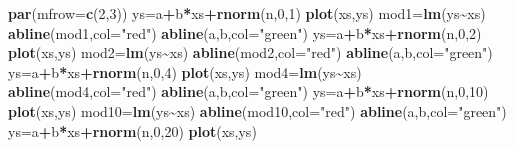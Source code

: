 \documentclass[
]{book}
\newenvironment{Shaded}{\begin{snugshade}}{\end{snugshade}}
\newcommand{\AttributeTok}[1]{\textcolor[rgb]{0.13,0.29,0.53}{#1}}
\newcommand{\DecValTok}[1]{\textcolor[rgb]{0.00,0.00,0.81}{#1}}
\newcommand{\FunctionTok}[1]{\textcolor[rgb]{0.13,0.29,0.53}{\textbf{#1}}}
\newcommand{\NormalTok}[1]{#1}
\newcommand{\OtherTok}[1]{\textcolor[rgb]{0.56,0.35,0.01}{#1}}
\newcommand{\SpecialCharTok}[1]{\textcolor[rgb]{0.81,0.36,0.00}{\textbf{#1}}}
\newcommand{\StringTok}[1]{\textcolor[rgb]{0.31,0.60,0.02}{#1}}
\begin{document}
\begin{Shaded}
\begin{Highlighting}[]
\FunctionTok{par}\NormalTok{(}\AttributeTok{mfrow=}\FunctionTok{c}\NormalTok{(}\DecValTok{2}\NormalTok{,}\DecValTok{3}\NormalTok{))}
\NormalTok{ys}\OtherTok{=}\NormalTok{a}\SpecialCharTok{+}\NormalTok{b}\SpecialCharTok{*}\NormalTok{xs}\SpecialCharTok{+}\FunctionTok{rnorm}\NormalTok{(n,}\DecValTok{0}\NormalTok{,}\DecValTok{1}\NormalTok{)}
\FunctionTok{plot}\NormalTok{(xs,ys)}
\NormalTok{mod1}\OtherTok{=}\FunctionTok{lm}\NormalTok{(ys}\SpecialCharTok{\textasciitilde{}}\NormalTok{xs)}
\FunctionTok{abline}\NormalTok{(mod1,}\AttributeTok{col=}\StringTok{"red"}\NormalTok{)}
\FunctionTok{abline}\NormalTok{(a,b,}\AttributeTok{col=}\StringTok{"green"}\NormalTok{)}
\NormalTok{ys}\OtherTok{=}\NormalTok{a}\SpecialCharTok{+}\NormalTok{b}\SpecialCharTok{*}\NormalTok{xs}\SpecialCharTok{+}\FunctionTok{rnorm}\NormalTok{(n,}\DecValTok{0}\NormalTok{,}\DecValTok{2}\NormalTok{)}
\FunctionTok{plot}\NormalTok{(xs,ys)}
\NormalTok{mod2}\OtherTok{=}\FunctionTok{lm}\NormalTok{(ys}\SpecialCharTok{\textasciitilde{}}\NormalTok{xs)}
\FunctionTok{abline}\NormalTok{(mod2,}\AttributeTok{col=}\StringTok{"red"}\NormalTok{)}
\FunctionTok{abline}\NormalTok{(a,b,}\AttributeTok{col=}\StringTok{"green"}\NormalTok{)}
\NormalTok{ys}\OtherTok{=}\NormalTok{a}\SpecialCharTok{+}\NormalTok{b}\SpecialCharTok{*}\NormalTok{xs}\SpecialCharTok{+}\FunctionTok{rnorm}\NormalTok{(n,}\DecValTok{0}\NormalTok{,}\DecValTok{4}\NormalTok{)}
\FunctionTok{plot}\NormalTok{(xs,ys)}
\NormalTok{mod4}\OtherTok{=}\FunctionTok{lm}\NormalTok{(ys}\SpecialCharTok{\textasciitilde{}}\NormalTok{xs)}
\FunctionTok{abline}\NormalTok{(mod4,}\AttributeTok{col=}\StringTok{"red"}\NormalTok{)}
\FunctionTok{abline}\NormalTok{(a,b,}\AttributeTok{col=}\StringTok{"green"}\NormalTok{)}
\NormalTok{ys}\OtherTok{=}\NormalTok{a}\SpecialCharTok{+}\NormalTok{b}\SpecialCharTok{*}\NormalTok{xs}\SpecialCharTok{+}\FunctionTok{rnorm}\NormalTok{(n,}\DecValTok{0}\NormalTok{,}\DecValTok{10}\NormalTok{)}
\FunctionTok{plot}\NormalTok{(xs,ys)}
\NormalTok{mod10}\OtherTok{=}\FunctionTok{lm}\NormalTok{(ys}\SpecialCharTok{\textasciitilde{}}\NormalTok{xs)}
\FunctionTok{abline}\NormalTok{(mod10,}\AttributeTok{col=}\StringTok{"red"}\NormalTok{)}
\FunctionTok{abline}\NormalTok{(a,b,}\AttributeTok{col=}\StringTok{"green"}\NormalTok{)}
\NormalTok{ys}\OtherTok{=}\NormalTok{a}\SpecialCharTok{+}\NormalTok{b}\SpecialCharTok{*}\NormalTok{xs}\SpecialCharTok{+}\FunctionTok{rnorm}\NormalTok{(n,}\DecValTok{0}\NormalTok{,}\DecValTok{20}\NormalTok{)}
\FunctionTok{plot}\NormalTok{(xs,ys)}

\end{Highlighting}
\end{Shaded}
\end{document}
